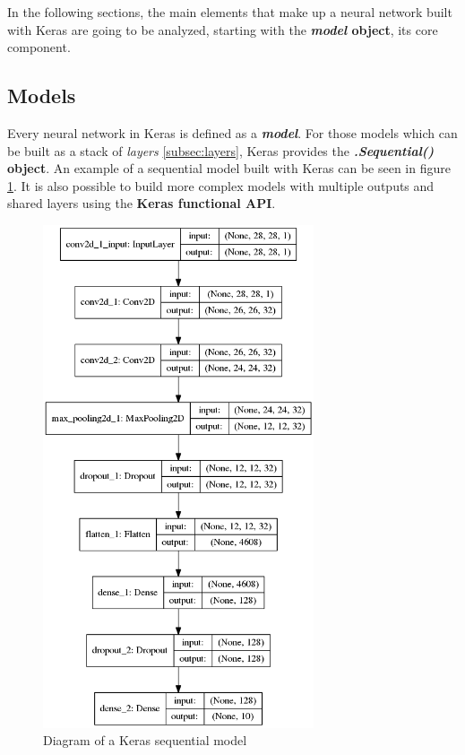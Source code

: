 In the following sections, the main elements that make up a neural network built with Keras are going to be analyzed, starting with the \textbf{\textit{model} object}, its core component.

\subsection{Models}\label{subsec:models}
Every neural network in Keras is defined as a \textbf{\textit{model}}. For those models which can be built as a stack of \textit{layers} \ref{subsec:layers}, Keras provides the \textbf{\textit{.Sequential()} object}. An example of a sequential model built with Keras can be seen in figure \ref{fig:model}. It is also possible to build more complex models with multiple outputs and shared layers using the \textbf{Keras functional API}.
\begin{figure}
	\centering
	\includegraphics[width=8cm, keepaspectratio]{figures/model.png}
	\caption{Diagram of a Keras sequential model}
	\label{fig:model}
\end{figure}


